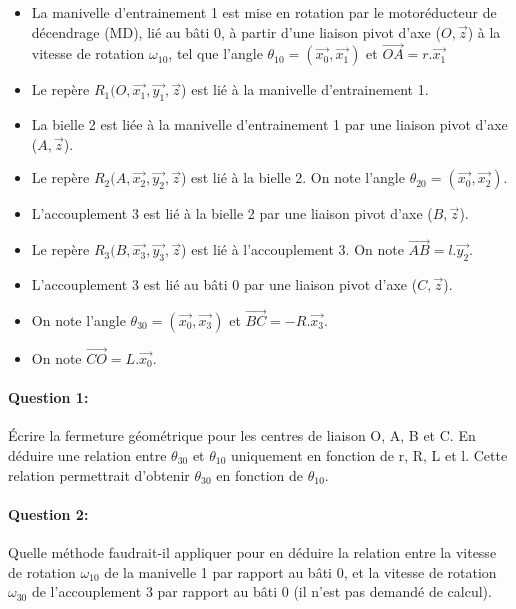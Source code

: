 \begin{itemize}
 \item La manivelle d'entrainement 1 est mise en rotation par le motoréducteur de décendrage (MD), lié au bâti 0, à partir d'une liaison pivot d'axe ($O,\overrightarrow{z}$) à la vitesse de rotation $\omega_{10}$, tel que l'angle $\theta_{10} =(\overrightarrow{x_0},\overrightarrow{x_1})$ et $\overrightarrow{OA} = r.\overrightarrow{x_1}$
 \item Le repère $R_1(O,\overrightarrow{x_1},\overrightarrow{y_1},\overrightarrow{z}$) est lié à la manivelle d'entrainement 1.
 \item La bielle 2 est liée à la manivelle d'entrainement 1 par une liaison pivot d'axe ($A,\overrightarrow{z}$).
 \item Le repère $R_2(A,\overrightarrow{x_2},\overrightarrow{y_2},\overrightarrow{z}$) est lié à la bielle 2. On note l'angle $\theta_{20} =(\overrightarrow{x_0},\overrightarrow{x_2})$.
 \item L'accouplement 3 est lié à la bielle 2 par une liaison pivot d'axe ($B,\overrightarrow{z}$).
 \item Le repère $R_3(B,\overrightarrow{x_3},\overrightarrow{y_3},\overrightarrow{z}$) est lié à l'accouplement 3. On note $\overrightarrow{AB} = l.\overrightarrow{y_2}$.
 \item L'accouplement 3 est lié au bâti 0 par une liaison pivot d'axe ($C,\overrightarrow{z}$).
 \item On note l'angle $\theta_{30} =(\overrightarrow{x_0},\overrightarrow{x_3})$ et $\overrightarrow{BC} = -R.\overrightarrow{x_3}$.
 \item On note $\overrightarrow{CO} = L.\overrightarrow{x_0}$.
\end{itemize}

\paragraph{Question 1:} Écrire la fermeture géométrique pour les centres de liaison O, A, B et C.
En déduire une relation entre $\theta_{30}$ et $\theta_{10}$ uniquement en fonction de r, R, L et l. Cette relation permettrait d'obtenir $\theta_{30}$ en fonction de $\theta_{10}$.

\paragraph{Question 2:} Quelle méthode faudrait-il appliquer pour en déduire la relation entre la vitesse de rotation $\omega_{10}$ de la manivelle 1 par rapport au bâti 0, et la vitesse de rotation $\omega_{30}$ de l'accouplement 3 par rapport au bâti 0 (il n'est pas demandé de calcul).

